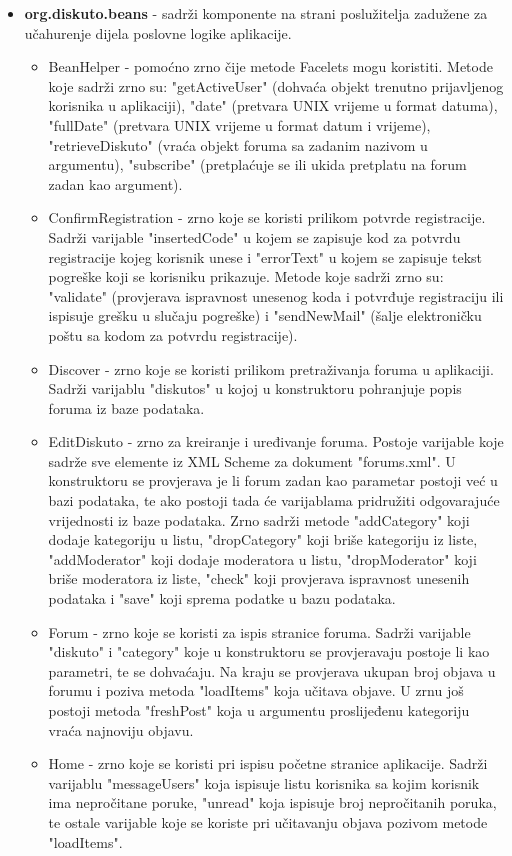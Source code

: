 \documentclass{foi}
\begin{document}
\begin{itemize}
\item \textbf{org.diskuto.beans} - sadrži komponente na strani poslužitelja zadužene za učahurenje dijela poslovne logike aplikacije.
\begin{itemize}
        \item BeanHelper - pomoćno zrno čije metode Facelets mogu koristiti. Metode koje sadrži zrno su: "getActiveUser" (dohvaća objekt trenutno prijavljenog korisnika u aplikaciji), "date" (pretvara UNIX vrijeme u format datuma), "fullDate" (pretvara UNIX vrijeme u format datum i vrijeme), "retrieveDiskuto" (vraća objekt foruma sa zadanim nazivom u argumentu), "subscribe" (pretplaćuje se ili ukida pretplatu na forum zadan kao argument).
	\item ConfirmRegistration - zrno koje se koristi prilikom potvrde registracije. Sadrži varijable "insertedCode" u kojem se zapisuje kod za potvrdu registracije kojeg korisnik unese i "errorText" u kojem se zapisuje tekst pogreške koji se korisniku prikazuje. Metode koje sadrži zrno su: "validate" (provjerava ispravnost unesenog koda i potvrđuje registraciju ili ispisuje grešku u slučaju pogreške) i  "sendNewMail" (šalje elektroničku poštu sa kodom za potvrdu registracije).
	\item Discover - zrno koje se koristi prilikom pretraživanja foruma u aplikaciji. Sadrži varijablu "diskutos" u kojoj u konstruktoru pohranjuje popis foruma iz baze podataka.
	\item EditDiskuto - zrno za kreiranje i uređivanje foruma. Postoje varijable koje sadrže sve elemente iz XML Scheme za dokument "forums.xml". U konstruktoru se provjerava je li forum zadan kao parametar postoji već u bazi podataka, te ako postoji tada će varijablama pridružiti odgovarajuće vrijednosti iz baze podataka. Zrno sadrži metode "addCategory" koji dodaje kategoriju u listu, "dropCategory" koji briše kategoriju iz liste, "addModerator" koji dodaje moderatora u listu, "dropModerator" koji briše moderatora iz liste, "check" koji provjerava ispravnost unesenih podataka i "save" koji sprema podatke u bazu podataka.
	\item Forum - zrno koje se koristi za ispis stranice foruma. Sadrži varijable "diskuto" i "category" koje u konstruktoru se provjeravaju postoje li kao parametri, te se dohvaćaju. Na kraju se provjerava ukupan broj objava u forumu i poziva metoda "loadItems" koja učitava objave. U zrnu još postoji metoda "freshPost" koja u argumentu proslijeđenu kategoriju vraća najnoviju objavu.
	\item Home - zrno koje se koristi pri ispisu početne stranice aplikacije. Sadrži varijablu "messageUsers" koja ispisuje listu korisnika sa kojim korisnik ima nepročitane poruke, "unread" koja ispisuje broj nepročitanih poruka, te ostale varijable koje se koriste pri učitavanju objava pozivom metode "loadItems".

\end{itemize}
\end{itemize}
\end{document}
